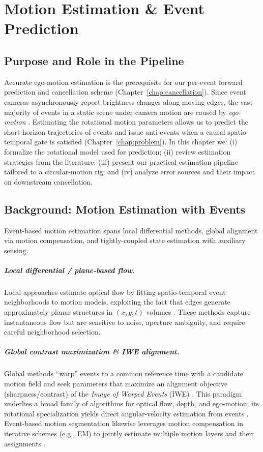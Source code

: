 \chapter{Motion Estimation \& Event Prediction}
\label{chap:motion}

\section{Purpose and Role in the Pipeline}
Accurate ego-motion estimation is the prerequisite for our per-event forward prediction and cancellation scheme (Chapter~\ref{chap:cancellation}). Since event cameras asynchronously report brightness changes along moving edges, the vast majority of events in a static scene under camera motion are caused by \emph{ego-motion} \cite{Gallego2020Survey}. Estimating the rotational motion parameters allows us to predict the short-horizon trajectories of events and issue anti-events when a causal spatio-temporal gate is satisfied (Chapter~\ref{chap:problem}). In this chapter we: (i) formalize the rotational model used for prediction; (ii) review estimation strategies from the literature; (iii) present our practical estimation pipeline tailored to a circular-motion rig; and (iv) analyze error sources and their impact on downstream cancellation.

\section{Background: Motion Estimation with Events}
Event-based motion estimation spans local differential methods, global alignment via motion compensation, and tightly-coupled state estimation with auxiliary sensing.

\paragraph{Local differential / plane-based flow.}
Local approaches estimate optical flow by fitting spatio-temporal event neighborhoods to motion models, exploiting the fact that edges generate approximately planar structures in $(x,y,t)$ volumes \cite{Benosman2014Epipolar}. These methods capture instantaneous flow but are sensitive to noise, aperture ambiguity, and require careful neighborhood selection.

\paragraph{Global contrast maximization \& IWE alignment.}
Global methods ``warp'' events to a common reference time with a candidate motion field and seek parameters that maximize an alignment objective (sharpness/contrast) of the \emph{Image of Warped Events} (IWE) \cite{Gallego2018CMax}. This paradigm underlies a broad family of algorithms for optical flow, depth, and ego-motion; its rotational specialization yields direct angular-velocity estimation from events \cite{Gallego2017Angular}. Event-based motion segmentation likewise leverages motion compensation in iterative schemes (e.g., EM) to jointly estimate multiple motion layers and their assignments \cite{Stoffregen2019Segmentation}.

